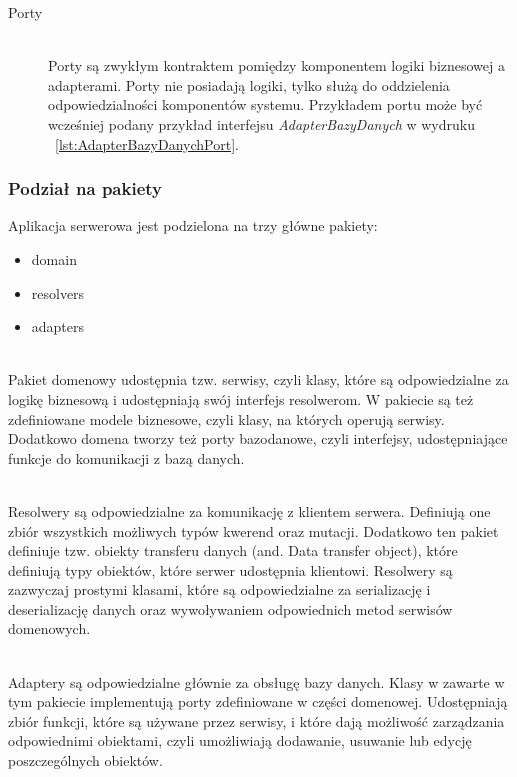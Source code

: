 \begin{description}
\vspace{0.4cm}

\item[Porty] \hfill \\ Porty są zwykłym kontraktem pomiędzy komponentem logiki biznesowej a adapterami. Porty nie posiadają logiki, tylko służą do oddzielenia odpowiedzialności komponentów systemu. Przykładem portu może być wcześniej podany przykład interfejsu \emph{AdapterBazyDanych} w wydruku ~\ref{lst:AdapterBazyDanychPort}.

\end{description}

\subsubsection{Podział na pakiety}
Aplikacja serwerowa jest podzielona na trzy główne pakiety:
\begin{itemize}
  \item domain
  \item resolvers
  \item adapters
\end{itemize}
\begin{description}[leftmargin={15pt},labelindent={0pt}]

  \item[Domain] \hfill \\ Pakiet domenowy udostępnia tzw. serwisy, czyli klasy, które są odpowiedzialne za logikę biznesową i udostępniają swój interfejs resolwerom. W pakiecie są też zdefiniowane modele biznesowe, czyli klasy, na których operują serwisy. Dodatkowo domena tworzy też porty bazodanowe, czyli interfejsy, udostępniające funkcje do komunikacji z bazą danych.
  \item[Resolvers] \hfill \\ Resolwery są odpowiedzialne za komunikację z klientem serwera. Definiują one zbiór wszystkich możliwych typów kwerend oraz mutacji. Dodatkowo ten pakiet definiuje tzw. obiekty transferu danych (and. Data transfer object), które definiują typy obiektów, które serwer udostępnia klientowi. Resolwery są zazwyczaj prostymi klasami, które są odpowiedzialne za serializację i deserializację danych oraz wywoływaniem odpowiednich metod serwisów domenowych.
  \item[Adaptery] \hfill \\ Adaptery są odpowiedzialne głównie za obsługę bazy danych. Klasy w zawarte w tym pakiecie implementują porty zdefiniowane w części domenowej. Udostępniają zbiór funkcji, które są używane przez serwisy, i które dają możliwość zarządzania odpowiednimi obiektami, czyli umożliwiają dodawanie, usuwanie lub edycję poszczególnych obiektów.

\end{description}
